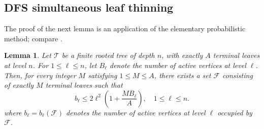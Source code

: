 \documentclass[12pt,letterpaper,reqno]{amsart}
\newtheorem{lemma}[theorem]{Lemma}
\theoremstyle{definition}
\theoremstyle{remark}
\numberwithin{equation}{section}
\begin{document}
	\subsection{DFS simultaneous leaf thinning}
	\label{sec:tree}
	
	The proof of the next lemma is an application of the elementary probabilistic
	method; compare \cite{AlonSpencer2016}.
	
	\begin{lemma}\label{lem:tree}
		Let $\mathcal T$ be a finite rooted tree of depth $n$, with exactly $A$
		terminal leaves at level $n$. For $1\leq\ell\leq n$, let $B_\ell$ denote
		the number of active vertices at level $\ell$. Then, for every integer $M$
		satisfying $1\leq M\leq A$, there exists a set $\mathcal F$ consisting of
		exactly $M$ terminal leaves such that
		\begin{equation}
			b_\ell
			\leq
			2\ell^2\left(1+\frac{MB_\ell}{A}\right),
			\quad 1\leq\ell\leq n.
			\label{eq:tree-bound}
		\end{equation}
		where $b_\ell=b_\ell(\mathcal F)$ denotes the number of active vertices at
		level $\ell$ occupied by $\mathcal F$.
	\end{lemma}
	
\end{document}
